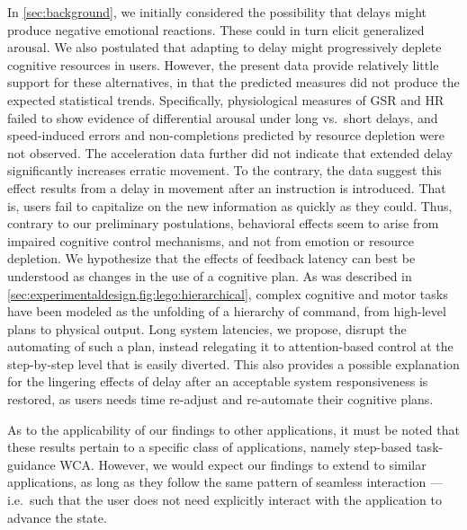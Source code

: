 In \cref{sec:background}, we initially considered the possibility that delays might produce negative emotional
reactions.
These could in turn elicit generalized arousal.
We also postulated that adapting to delay might progressively deplete cognitive resources in users.
However, the present data provide relatively little support for these alternatives, in that the predicted measures
did not produce the expected statistical trends.
Specifically, physiological measures of GSR and HR failed to show evidence of differential arousal under long vs.\
short delays, and speed-induced errors and non-completions predicted by resource depletion were not observed.
The acceleration data further did not indicate that extended delay significantly increases erratic movement.
To the contrary, the data suggest this effect results from a delay in movement after an instruction is introduced.
That is, users fail to capitalize on the new information as quickly as they could.
Thus, contrary to our preliminary postulations, behavioral effects seem to arise from impaired cognitive control
mechanisms, and not from emotion or resource depletion.
We hypothesize that the effects of feedback latency can best be understood as changes in the use of a cognitive plan.
As was described in \cref{sec:experimentaldesign,fig:lego:hierarchical}, complex cognitive and motor tasks have been
modeled as the unfolding of a hierarchy of command, from high-level plans to physical output.
Long system latencies, we propose, disrupt the automating of such a plan, instead relegating it to attention-based
control at the step-by-step level that is easily diverted.
This also provides a possible explanation for the lingering effects of delay after an acceptable system
responsiveness is restored, as users needs time re-adjust and re-automate their cognitive plans.

As to the applicability of our findings to other applications, it must be noted that these results pertain to a
specific class of applications, namely step-based task-guidance WCA.\@
However, we would expect our findings to extend to similar applications, as long as they follow the same pattern of
seamless interaction --- i.e.\ such that the user does not need explicitly interact with the application to advance
the state.

